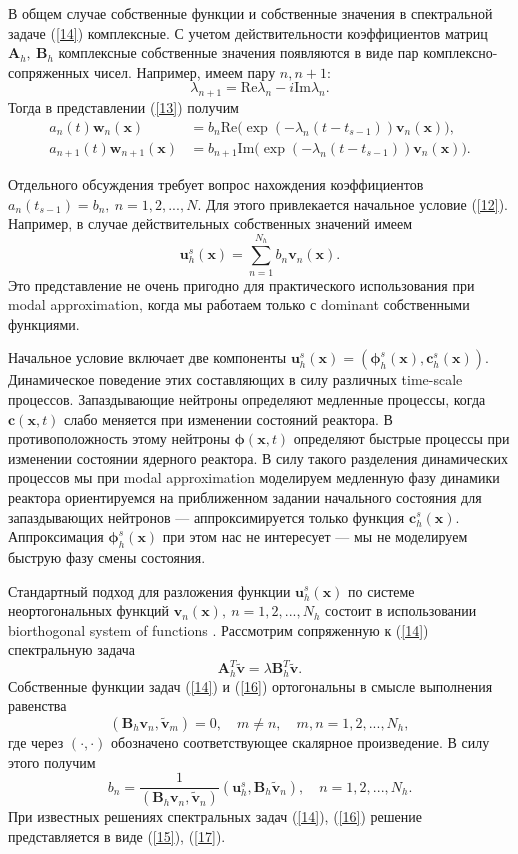 \documentclass[authoryear]{elsarticle}
\begin{document}
В общем случае собственные функции и собственные значения в спектральной задаче (\ref{14}) комплексные.
С учетом действительности коэффициентов матриц $\bm A_h, \ \bm B_h$ комплексные собственные значения
появляются в виде пар комплексно-сопряженных чисел. Например, имеем  пару $n,n+1$: 
\[
 \lambda_{n+1} = \mathrm{Re} \lambda_n - i \mathrm{Im} \lambda_n . 
\] 
Тогда в представлении (\ref{13}) получим
\[
\begin{split}
 a_n(t) \bm w_n(\bm x) & = b_n \mathrm{Re} \big ( \exp(-\lambda_n (t-t_{s-1})) \bm v_n(\bm x) \big ), \\
 a_{n+1}(t) \bm w_{n+1}(\bm x) & = b_{n+1} \mathrm{Im} \big ( \exp(-\lambda_n (t-t_{s-1})) \bm v_n(\bm x) \big ) .
\end{split}
\] 

Отдельного обсуждения требует вопрос нахождения коэффициентов $a_n(t_{s-1}) = b_n, \ n = 1,2, ..., N$.
Для этого привлекается начальное условие (\ref{12}).
Например, в случае действительных собственных значений имеем
\[
 \bm u_h^s (\bm x) = \sum_{n=1}^{N_h} b_n \bm v_n(\bm x) .
\] 
Это представление не очень пригодно для практического использования при modal approximation,
когда мы работаем только с dominant собственными функциями. 

Начальное условие включает две компоненты $\bm u_h^s (\bm x) = (\bm \phi_h^s (\bm x), \bm c_h^s (\bm x))$.
Динамическое поведение этих составляющих в силу различных time-scale процессов.
Запаздывающие нейтроны определяют медленные процессы, когда $\bm c(\bm x,t)$ слабо меняется
при изменении состояний реактора.
В противоположность этому нейтроны $\bm \phi(\bm x,t)$ определяют быстрые процессы
при изменении состоянии ядерного реактора. 
В силу такого разделения динамических процессов мы при modal approximation
моделируем медленную фазу динамики реактора ориентируемся на приближенном задании
начального состояния для запаздывающих нейтронов --- аппроксимируется только функция $\bm c_h^s (\bm x)$. 
Аппроксимация $\bm \phi_h^s (\bm x)$ при этом нас не интересует --- мы не моделируем быструю фазу смены
состояния.

Стандартный подход для разложения функции $\bm u_h^s (\bm x) $ 
по системе неортогональных функций $\bm v_n(\bm x), \ n = 1,2, ..., N_h$ 
состоит в использовании biorthogonal system of functions 
\citep{henry1975nuclear,brezinski1991biorthogonality}. 
Рассмотрим сопряженную к (\ref{14}) спектральную задача 
\begin{equation}\label{16}
 \bm A_h^T \widetilde{\bm v}  = \lambda  \bm B_h^T \widetilde{\bm v} .
\end{equation} 
Собственные функции задач (\ref{14}) и (\ref{16}) ортогональны \citep{Laub2005,Ortega1987}  в смысле выполнения равенства
\[
  (\bm B_h \bm v_n, \widetilde{\bm v}_m)= 0, 
  \quad m \neq n,
  \quad m, n = 1,2, ..., N_h , 
\] 
где через $(\cdot, \cdot)$ обозначено соответствующее скалярное произведение.
В силу этого получим
\begin{equation}\label{17}
 b_n = \frac{1}{(\bm B_h \bm v_n, \widetilde{\bm v}_n)} (\bm u_h^s, \bm B_h \widetilde{\bm v}_n),
 \quad n = 1,2, ..., N_h .  
\end{equation} 
При известных решениях спектральных задач (\ref{14}), (\ref{16})  
решение представляется в виде (\ref{15}), (\ref{17}).
\end{document}
